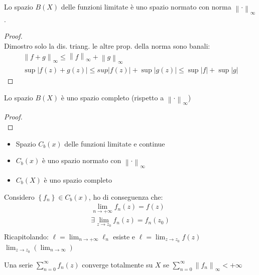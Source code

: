 \documentclass[a4paper, oneside]{article}
\begin{document}
    \begin{proposition}
        Lo spazio $B(X)$ delle funzioni limitate è uno spazio normato con norma $\left\lVert \cdot \right\rVert_\infty $.
    \end{proposition}
    \begin{proof}
        \hfill\\
        Dimostro solo la dis. triang. le altre prop. della norma sono banali:
        \begin{gather*}
            \left\lVert f + g \right\rVert_\infty \leq \left\lVert f \right\rVert_\infty + \left\lVert g \right\rVert_\infty\\
            \sup \left\lvert f(z) + g(z) \right\rvert \leq sup \left\lvert f(z) \right\rvert + \sup \left\lvert g(z) \right\rvert \leq \sup \left\lvert f \right\rvert + \sup \left\lvert g \right\rvert      
        \end{gather*}
    \end{proof}
    \begin{proposition}
        Lo spazio $B(X)$ è uno spazio completo (rispetto a $\left\lVert \cdot \right\rVert_\infty $)
    \end{proposition}
    \begin{proof}
        \hfill\\

    \end{proof}
    \begin{itemize}
        \item Spazio $C_b(x)$ delle funzioni limitate e continue
        \item $C_b(x)$ è uno spazio normato con $\left\lVert \cdot \right\rVert_\infty $
        \item $C_b(X)$ è uno spazio completo
    \end{itemize}
    Considero $\left\{f_n\right\}  \in C_b(x)$, ho di conseguenza che:
    \begin{gather*}
        \lim_{n \to +\infty} f_n(z) = f(z) \\
        \exists \lim_{z \to z_0} f_n(z) = f_n(z_0)\\
    \end{gather*}
    Ricapitolando:
    $\ell = \lim_{n \to +\infty} \ell_n$ esiste e $\ell = \lim_{z \to z_0} f(z)$\\
    $\lim_{z \to z_0} \left( \lim_{n \to \infty} \right) $
    \begin{definition}
        Una serie $\sum_{n=0}^{\infty} f_n(z)$ converge totalmente su $X$ se $\sum_{n=0}^{\infty} \left\lVert f_n \right\rVert_\infty < +\infty$
    \end{definition}
    
\end{document}
